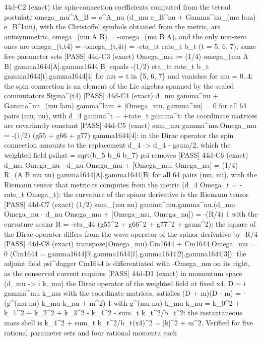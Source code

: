 \documentclass[
  10pt,
]{article}
\newenvironment{Shaded}{}{}
\newcommand{\NormalTok}[1]{#1}
\begin{document}
\begin{Shaded}
\begin{Highlighting}[]
\NormalTok{[PASS] 44d{-}C2  (exact) the spin{-}connection coefficients computed from the tetrad postulate omega\_mu\^{}A\_B = e\^{}A\_nu (d\_mu e\_B\^{}nu + Gamma\^{}nu\_(mu lam) e\_B\^{}lam), with the Christoffel symbols obtained from the metric, are antisymmetric, omega\_(mu A B) = {-}omega\_(mu B A), and the only non{-}zero ones are omega\_(t,t4) = {-}omega\_(t,4t) = {-}eta\_tt rate\_t b\_t (t = 5, 6, 7); same five parameter sets}
\NormalTok{[PASS] 44d{-}C3  (exact) Omega\_mu := (1/4) omega\_(mu A B) gamma1644[A].gamma1644[B] equals {-}(1/2) eta\_tt rate\_t b\_t gamma1644[t].gamma1644[4] for mu = t in \{5, 6, 7\} and vanishes for mu = 0..4: the spin connection is an element of the Lie algebra spanned by the scaled commutators Sigma\^{}(t4)}
\NormalTok{[PASS] 44d{-}C4  (exact) d\_mu gamma\^{}nu + Gamma\^{}nu\_(mu lam) gamma\^{}lam + [Omega\_mu, gamma\^{}nu] = 0 for all 64 pairs (mu, nu), with d\_4 gamma\^{}t = +rate\_t gamma\^{}t: the coordinate matrices are covariantly constant}
\NormalTok{[PASS] 44d{-}C5  (exact) sum\_mu gamma\^{}mu.Omega\_mu = {-}(1/2) (g55 + g66 + g77) gamma1644[4]: in the Dirac operator the spin connection amounts to the replacement d\_4 {-}\textgreater{} d\_4 {-} gsum/2, which the weighted field psihat = sqrt(b\_5 b\_6 b\_7) psi removes}
\NormalTok{[PASS] 44d{-}C6  (exact) d\_mu Omega\_nu {-} d\_nu Omega\_mu + [Omega\_mu, Omega\_nu] = (1/4) R\_(A B mu nu) gamma1644[A].gamma1644[B] for all 64 pairs (mu, nu), with the Riemann tensor that metric.rs computes from the metric (d\_4 Omega\_t = {-}rate\_t Omega\_t): the curvature of the spinor derivative is the Riemann tensor}
\NormalTok{[PASS] 44d{-}C7  (exact) (1/2) sum\_(mu nu) gamma\^{}mu.gamma\^{}nu.(d\_mu Omega\_nu {-} d\_nu Omega\_mu + [Omega\_mu, Omega\_nu]) = {-}(R/4) 1 with the curvature scalar R = {-}eta\_44 (g55\^{}2 + g66\^{}2 + g77\^{}2 + gsum\^{}2): the square of the Dirac operator differs from the wave operator of the spinor derivative by {-}R/4}
\NormalTok{[PASS] 44d{-}C8  (exact) transpose(Omega\_mu).Cm1644 + Cm1644.Omega\_mu = 0 (Cm1644 = gamma1644[0].gamma1644[1].gamma1644[2].gamma1644[3]): the adjoint field psi\^{}dagger Cm1644 is differentiated with {-}Omega\_mu on its right, as the conserved current requires}
\NormalTok{[PASS] 44d{-}D1  (exact) in momentum space (d\_mu {-}\textgreater{} i k\_mu) the Dirac operator of the weighted field at fixed x4, D = i gamma\^{}mu k\_mu with the coordinate matrices, satisfies (D + m)(D {-} m) = {-}(g\^{}(mu nu) k\_mu k\_nu + m\^{}2) 1 with g\^{}(mu nu) k\_mu k\_nu = k\_0\^{}2 + k\_1\^{}2 + k\_2\^{}2 + k\_3\^{}2 {-} k\_4\^{}2 {-} sum\_t k\_t\^{}2/b\_t\^{}2: the instantaneous mass shell is k\_4\^{}2 + sum\_t k\_t\^{}2/b\_t(x4)\^{}2 = |k|\^{}2 + m\^{}2. Verified for five rational parameter sets and four rational momenta each}

\end{Highlighting}
\end{Shaded}
\end{document}
